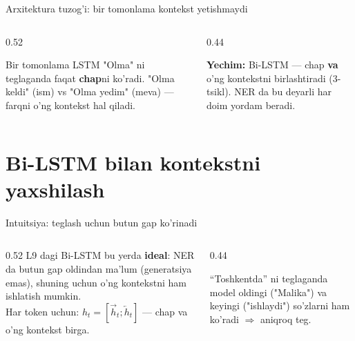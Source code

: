 \documentclass[aspectratio=169,11pt]{beamer}
\begin{document}
\begin{frame}{Arxitektura tuzog'i: bir tomonlama kontekst yetishmaydi}
  \begin{columns}[T]
    \begin{column}{0.52\textwidth}
      \begin{tcolorbox}[warnbox,title=O'ng kontekst kerak]
        \small
        Bir tomonlama LSTM "Olma" ni teglaganda faqat \textbf{chap}ni ko'radi.
        "Olma keldi" (ism) vs "Olma yedim" (meva) --- farqni o'ng kontekst hal qiladi.
      \end{tcolorbox}
    \end{column}
    \begin{column}{0.44\textwidth}
      \begin{tcolorbox}[okbox,top=2pt,bottom=2pt]
        \footnotesize
        \textbf{Yechim:} Bi-LSTM --- chap \textbf{va} o'ng kontekstni birlashtiradi
        (3-tsikl). NER da bu deyarli har doim yordam beradi.
      \end{tcolorbox}
    \end{column}
  \end{columns}
\end{frame}

\section[Bi-LSTM]{Bi-LSTM bilan kontekstni yaxshilash}

\begin{frame}{Intuitsiya: teglash uchun butun gap ko'rinadi}
  \begin{columns}[T]
    \begin{column}{0.52\textwidth}
      \small
      L9 dagi Bi-LSTM bu yerda \textbf{ideal}: NER da butun gap oldindan ma'lum
      (generatsiya emas), shuning uchun o'ng kontekstni ham ishlatish mumkin.\\[6pt]
      Har token uchun: $h_t=[\overrightarrow{h}_t;\overleftarrow{h}_t]$ ---
      chap va o'ng kontekst birga.
    \end{column}
    \begin{column}{0.44\textwidth}
      \begin{tcolorbox}[okbox,top=2pt,bottom=2pt]
        \footnotesize
        ``Toshkentda'' ni teglaganda model oldingi ("Malika") va keyingi
        ("ishlaydi") so'zlarni ham ko'radi $\Rightarrow$ aniqroq teg.
      \end{tcolorbox}
    \end{column}
  \end{columns}
\end{frame}
\end{document}
